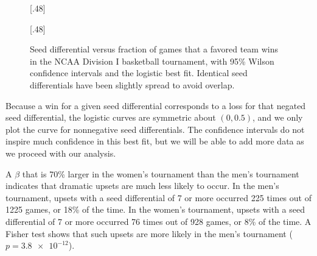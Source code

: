 \documentclass{article}
\begin{document}
\begin{figure}
[.48\textwidth]{%
%
}\hfill
{}[.48\textwidth]{%
}
\caption{\label{fig:D1_WL_prob}Seed differential versus fraction of games that a favored team wins in the NCAA Division I basketball tournament, with 95\% Wilson confidence intervals and the logistic best fit.  Identical seed differentials have been slightly spread to avoid overlap.}
\end{figure}
Because a win for a given seed differential corresponds to a loss for that negated seed differential, the logistic curves are symmetric about $(0,0.5)$, and we only plot the curve for nonnegative seed differentials.  The confidence intervals do not inspire much confidence in this best fit, but we will be able to add more data as we proceed with our analysis.

A $\beta$ that is 70\% larger in the women's tournament than the men's tournament indicates that dramatic upsets are much less likely to occur.  In the men's tournament, upsets with a seed differential of 7 or more occurred 225 times out of 1225 games, or 18\% of the time.
In the women's tournament, upsets with a seed differential of 7 or more occurred 76 times out of 928 games, or 8\% of the time.
A Fisher test shows that such upsets are more likely in the men's tournament ($p=\num{3.8e-12}$).
\end{document}
